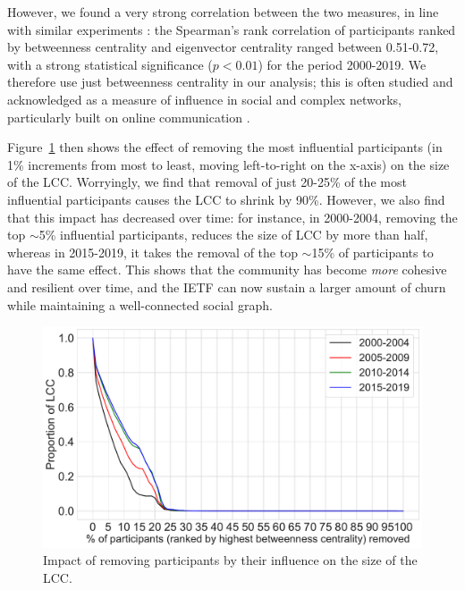 \documentclass[twocolumn,10pt]{article}
\newlength{\figureWidthOneColumn}
\begin{document}
However, we found a very strong correlation between the two measures, 
in line with similar experiments \cite{valente2008correlated,he2016correlation}:
the Spearman's rank correlation of participants ranked by betweenness
centrality and eigenvector centrality ranged between 0.51-0.72, with a
strong statistical significance ($p < 0.01$) for the period 2000-2019. We
therefore use just betweenness centrality in our analysis; this is often
studied and acknowledged as a measure of influence in social and complex
networks, particularly built on online communication
\cite{hagen2018crisis,chen2012identifying, ghalmane2019centrality}.

Figure~\ref{fig:purge_nodes_largest_connected_component_number_components}
then shows the effect of removing the most influential participants (in 1\%
increments from most to least, moving left-to-right on the x-axis) on the
size of the LCC.  Worryingly, we find that removal of just 20-25\% of the
most influential participants causes the LCC to shrink by 90\%.  However,
we also find that this impact has decreased over time: for instance, in
2000-2004, removing the top $\sim$5\% influential participants, reduces the
size of LCC by more than half, whereas in 2015-2019, it takes the removal
of the top $\sim$15\% of participants to have the same effect.  This shows
that the community has become \emph{more} cohesive and resilient over time,
and the IETF can now sustain a larger amount of churn while maintaining a
well-connected social graph.

\begin{figure}
  \centering
  \includegraphics[width=\figureWidthOneColumn]{figures-prev/icwsm-2022/lcc_proportion_granular_yearly.pdf}
  \caption{
    Impact of removing participants by their influence on the size
    of the LCC.
  }
  \label{fig:purge_nodes_largest_connected_component_number_components}
\end{figure}
\end{document}
